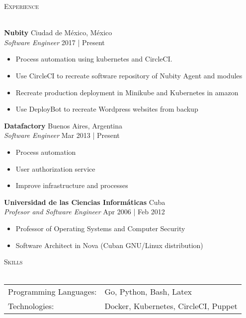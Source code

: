 \documentclass[a4paper]{article}
\newcommand{\lineunder} {
    \vspace*{-8pt} \\
    \hspace*{-18pt} \hrulefill \\
}
\newcommand{\header} [1] {
    {\hspace*{-18pt}\vspace*{6pt} \textsc{#1}}
    \vspace*{-6pt} \lineunder
}
\begin{document}
\header{Experience}
\vspace{1mm}

\textbf{Nubity} \hfill Ciudad de México, México\\
\textit{Software Engineer} \hfill 2017 | Present\\
\vspace{-1mm}
\begin{itemize} \itemsep 1pt
 \item Process automation using kubernetes and CircleCI.
 \item Use CircleCI to recreate software repository of Nubity Agent and modules
 \item Recreate production deployment in Minikube and Kubernetes in amazon
 \item Use DeployBot to recreate Wordpress websites from backup
\end{itemize}
\textbf{Datafactory} \hfill Buenos Aires, Argentina\\
\textit{Software Engineer} \hfill Mar 2013 | Present\\
\vspace{-1mm}
\begin{itemize} \itemsep 1pt
 \item Process automation
 \item User authorization service
 \item Improve infrastructure and processes
\end{itemize}
\textbf{Universidad de las Ciencias Informáticas} \hfill Cuba\\
\textit{Profesor and Software Engineer} \hfill Apr 2006 | Feb 2012\\
\vspace{-1mm}
\begin{itemize} \itemsep 1pt
 \item Professor of Operating Systems and Computer Security
 \item Software Architect in Nova (Cuban GNU/Linux distribution)
\end{itemize}

\header{Skills}
\begin{tabular}{ l l }
 Programming Languages: & Go, Python, Bash, Latex              \\
 Technologies:          & Docker, Kubernetes, CircleCI, Puppet \\
\end{tabular}
\vspace{2mm}
\end{document}
